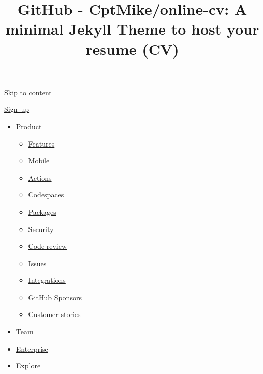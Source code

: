 \documentclass[]{article}
\title{GitHub - CptMike/online-cv: A minimal Jekyll Theme to host your resume
(CV)}
\date{}
\providecommand{\tightlist}{%
  \setlength{\itemsep}{0pt}\setlength{\parskip}{0pt}}
\begin{document}
\maketitle

\protect\hyperlink{start-of-content}{Skip to content} { {} }

\href{/signup?ref_cta=Sign+up\&ref_loc=header+logged+out\&ref_page=\%2F\%3Cuser-name\%3E\%2F\%3Crepo-name\%3E\&source=header-repo}{Sign~up}

\begin{itemize}
\tightlist
\item
  Product

  \begin{itemize}
  \tightlist
  \item
    \href{/features}{Features}
  \item
    \href{/mobile}{Mobile}
  \item
    \href{/features/actions}{Actions}
  \item
    \href{/features/codespaces}{Codespaces}
  \item
    \href{/features/packages}{Packages}
  \item
    \href{/features/security}{Security}
  \item
    \href{/features/code-review}{Code review}
  \item
    \href{/features/issues}{Issues}
  \item
    \href{/features/integrations}{Integrations}
  \item
    \href{/sponsors}{GitHub Sponsors}
  \item
    \href{/customer-stories}{Customer stories}
  \end{itemize}
\item
  \href{/team}{Team}
\item
  \href{/enterprise}{Enterprise}
\item
  Explore


\end{itemize}
\end{document}
